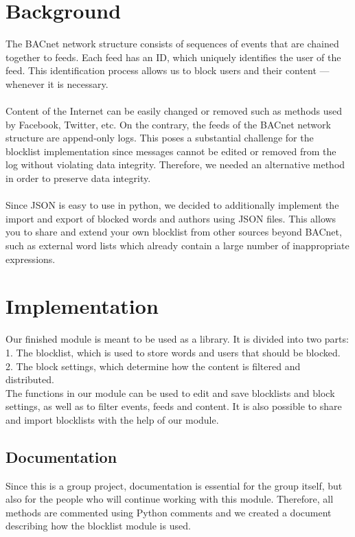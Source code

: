 \documentclass[12pt]{article}
\begin{document}
\section{Background}
The BACnet network structure consists of sequences of events that are chained together to feeds. 
Each feed has an ID, which uniquely identifies the user of the feed. 
This identification process allows us to block users and their content --- whenever it is necessary. \\
\\
Content of the Internet can be easily changed or removed such as methods used by Facebook, Twitter, etc. 
On the contrary, the feeds of the BACnet network structure are append-only logs.
This poses a substantial challenge for the blocklist implementation since messages cannot be edited or removed from the log without violating data integrity. 
Therefore, we needed an alternative method in order to preserve data integrity.\\
\\
Since JSON is easy to use in python, we decided to additionally implement the import and export of blocked words and authors using JSON files. 
This allows you to share and extend your own blocklist from other sources beyond BACnet, such as external word lists which already contain a large number of inappropriate expressions.

\section{Implementation}
Our finished module is meant to be used as a library. It is divided into two parts: \\
1. The blocklist, which is used to store words and users that should be blocked. \\
2. The block settings, which determine how the content is filtered and distributed. \\
The functions in our module can be used to edit and save blocklists and block settings, as well as to filter events, feeds and content. It is also possible to share and import blocklists with the help of our module.

\subsection{Documentation}
Since this is a group project, documentation is essential for the group itself, but also for the people who will continue working with this module. 
Therefore, all methods are commented using Python comments and we created a document describing how the blocklist module is used.
\end{document}
